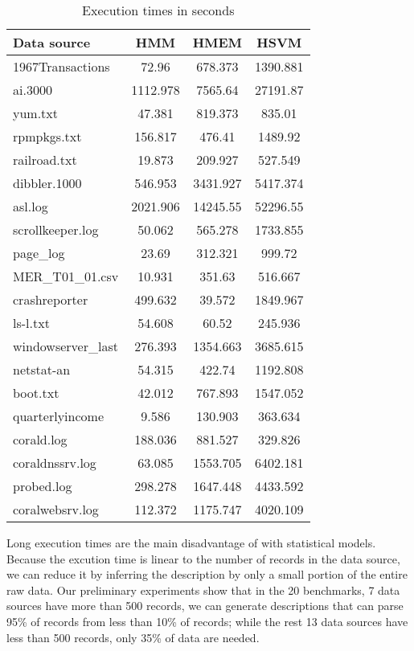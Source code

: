 \begin{table}
\begin{center}
\begin{tabular}{|l||c|c|c|}\hline
Data source & HMM & HMEM & HSVM \\ \hline 
1967Transactions & 72.96 & 678.373 & 1390.881   \\\hline 
ai.3000 & 1112.978 & 7565.64 & 27191.87 \\ \hline
yum.txt & 47.381 &  819.373 & 835.01\\ \hline
rpmpkgs.txt & 156.817 & 476.41 & 1489.92\\ \hline
railroad.txt & 19.873 & 209.927 & 527.549  \\ \hline
dibbler.1000 & 546.953 & 3431.927 & 5417.374   \\ \hline
asl.log & 2021.906 & 14245.55 & 52296.55 \\ \hline
scrollkeeper.log  &  50.062 & 565.278 & 1733.855 \\ \hline
page\_log  & 23.69 & 312.321 & 999.72 \\ \hline
MER\_T01\_01.csv & 10.931 & 351.63 & 516.667 \\ \hline
crashreporter & 499.632 & 39.572 & 1849.967 \\ \hline
ls-l.txt & 54.608 & 60.52 & 245.936 \\ \hline
windowserver\_last & 276.393 & 1354.663 & 3685.615 \\ \hline
netstat-an & 54.315 & 422.74 & 1192.808 \\ \hline
boot.txt & 42.012 &  767.893 & 1547.052 \\ \hline
quarterlyincome & 9.586 & 130.903 & 363.634   \\ \hline
corald.log & 188.036 &  881.527 & 329.826 \\ \hline
coraldnssrv.log  & 63.085 &  1553.705 & 6402.181\\ \hline
probed.log & 298.278 & 1647.448 & 4433.592 \\ \hline
coralwebsrv.log & 112.372 & 1175.747 & 4020.109 \\\hline
\end{tabular}
\caption{Execution times in seconds}
\label{tab:time}
\end{center}
\end{table}

Long execution times are the main disadvantage of \learnpads{} with
statistical models. Because the excution time is linear to the
number of records in the data source, we can reduce it by inferring
the description by only a small portion of the entire raw data. Our
preliminary experiments show that in the 20 benchmarks, 7 data sources
have more than 500 records, we can generate descriptions that can
parse 95\% of records from less than 10\% of records; while the rest
13 data sources have less than 500 records, only 35\% of data are
needed.


